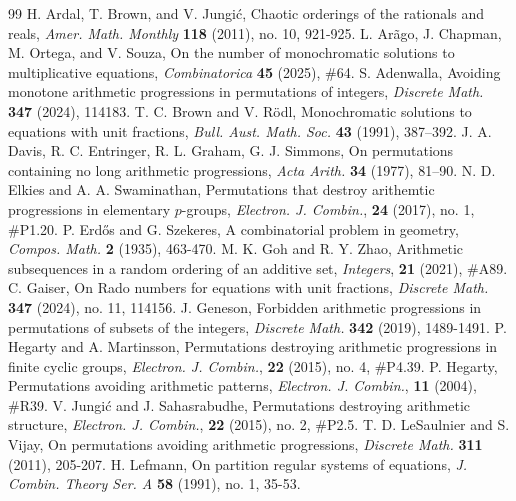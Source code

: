 \documentclass[10pt,a4paper]{amsart}
\begin{document}
\begin{thebibliography}{99}
 H. Ardal, T. Brown, and V. Jungi\'{c}, Chaotic orderings of the rationals and reals, \textit{Amer. Math. Monthly} \textbf{118} (2011), no. 10, 921-925.
 L. Ar\~{a}go, J. Chapman, M. Ortega, and V. Souza, On the number of monochromatic solutions to multiplicative equations, \textit{Combinatorica} \textbf{45} (2025), \#64.
 S. Adenwalla, Avoiding monotone arithmetic progressions in permutations of integers, \textit{Discrete Math.} \textbf{347} (2024), 114183.
 T. C. Brown and V. R\"{o}dl, Monochromatic solutions to equations with unit fractions, \textit{Bull. Aust. Math. Soc.} \textbf{43} (1991), 387–392.
 J. A. Davis, R. C. Entringer, R. L. Graham, G. J. Simmons, On permutations containing no long arithmetic progressions, \textit{Acta Arith.} \textbf{34} (1977), 81–90.
 N. D. Elkies and A. A. Swaminathan, Permutations that destroy arithemtic progressions in elementary $p$-groups, \textit{Electron. J. Combin.}, \textbf{24} (2017), no. 1, \#P1.20.
 P. Erd\H{o}s and G. Szekeres, A combinatorial problem in geometry, \textit{Compos. Math.} \textbf{2} (1935), 463-470.
 M. K. Goh and R. Y. Zhao, Arithmetic subsequences in a random ordering of an additive set, \textit{Integers}, \textbf{21} (2021), \#A89.
 C. Gaiser, On Rado numbers for equations with unit fractions, \textit{Discrete Math.} \textbf{347} (2024), no. 11, 114156.
 J. Geneson, Forbidden arithmetic progressions in permutations of subsets of the integers, \textit{Discrete Math.} \textbf{342} (2019), 1489-1491.
 P. Hegarty and A. Martinsson, Permutations destroying arithmetic progressions in finite cyclic groups, \textit{Electron. J. Combin.}, \textbf{22} (2015), no. 4, \#P4.39.
 P. Hegarty, Permutations avoiding arithmetic patterns, \textit{Electron. J. Combin.}, \textbf{11} (2004), \#R39.
 V. Jungi\'{c} and J. Sahasrabudhe, Permutations destroying arithmetic structure, \textit{Electron. J. Combin.}, \textbf{22} (2015), no. 2, \#P2.5.
 T. D. LeSaulnier and S. Vijay, On permutations avoiding arithmetic progressions, \textit{Discrete Math.} \textbf{311} (2011), 205-207.
 H. Lefmann, On partition regular systems of equations, \textit{J. Combin. Theory Ser. A} \textbf{58} (1991), no. 1, 35-53.

\end{thebibliography}
\end{document}

